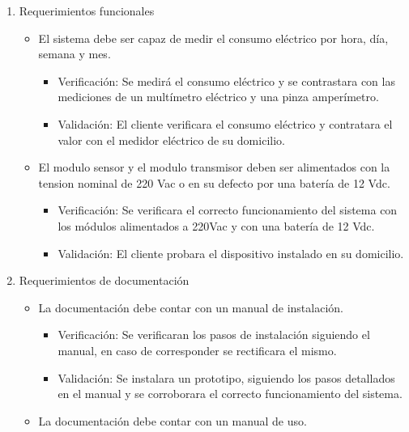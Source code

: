 \documentclass[
11pt, %
]{charter}
\begin{document}
\begin{enumerate}
	\item Requerimientos funcionales
		\begin{itemize}

			\item El sistema debe ser capaz de medir el consumo eléctrico por hora, día, semana y mes.

			\begin{itemize}
			\item Verificación: Se medirá el consumo eléctrico y se contrastara con las mediciones de un multímetro eléctrico y una pinza amperímetro.
			\item Validación: El cliente verificara el consumo eléctrico y contratara el valor con el medidor eléctrico de su domicilio.
			\end{itemize}

	\item El modulo sensor y el modulo transmisor deben ser alimentados con la tension nominal de 220 Vac o en su defecto por una batería de 12 Vdc.
			
			\begin{itemize}
		\item Verificación: Se verificara el correcto funcionamiento del sistema con los módulos alimentados a 220Vac y con una batería de 12 Vdc.
			\item Validación: El cliente probara el dispositivo instalado en su domicilio.
			\end{itemize}
			
		\end{itemize}
		
	\item Requerimientos de documentación
		\begin{itemize}

		\item La documentación debe contar con un manual de instalación.
			
		\begin{itemize}
		\item Verificación: Se verificaran los pasos de instalación siguiendo el manual, en caso de  corresponder se rectificara el mismo. 
		\item Validación: Se instalara un prototipo, siguiendo los pasos detallados en el manual y se corroborara el correcto funcionamiento del sistema.
		\end{itemize}
			
		\item La documentación debe contar con un manual de uso.
		

\end{itemize}
\end{enumerate}
\end{document}
